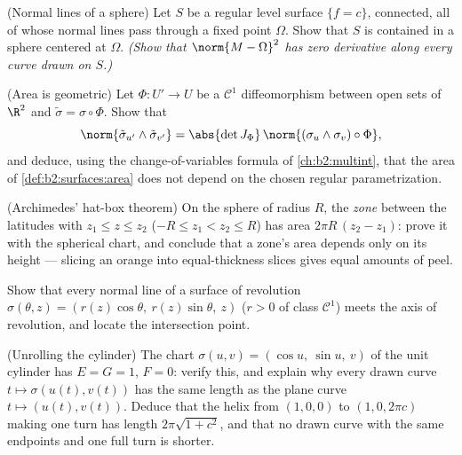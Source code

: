 \begin{exercise}[$\star\star\star$]\label{exo:b2:surfaces:7}
(Normal lines of a sphere) Let $S$ be a regular level surface
$\{f = c\}$, connected, all of whose normal lines pass through a
fixed point $\Omega$. Show that $S$ is contained in a sphere
centered at $\Omega$. \emph{(Show that $\norm{M - \Omega}^2$ has
zero derivative along every curve drawn on $S$.)}
\end{exercise}

\begin{exercise}[$\star\star\star$]\label{exo:b2:surfaces:8}
(Area is geometric) Let $\Phi \colon U' \to U$ be a $\mathcal{C}^1$
diffeomorphism between open sets of $\R^2$ and $\tilde\sigma =
\sigma \circ \Phi$. Show that
\[
\norm{\tilde\sigma_{u'} \wedge \tilde\sigma_{v'}}
= \abs{\det J_\Phi}\,
\norm{(\sigma_u \wedge \sigma_v)\circ\Phi} ,
\]
and deduce, using the change-of-variables formula of
\cref{ch:b2:multint}, that the area of
\cref{def:b2:surfaces:area} does not depend on the chosen regular
parametrization.
\end{exercise}

\begin{exercise}[$\star$]\label{exo:b2:surfaces:9}
(Archimedes' hat-box theorem) On the sphere of radius $R$, the
\emph{zone} between the latitudes with $z_1 \leq z \leq z_2$
($-R \leq z_1 < z_2 \leq R$) has area $2\pi R\,(z_2 - z_1)$:
prove it with the spherical chart, and conclude that a zone's
area depends only on its height --- slicing an orange into
equal-thickness slices gives equal amounts of peel.
\end{exercise}

\begin{exercise}[$\star\star$]\label{exo:b2:surfaces:10}
Show that every normal line of a surface of revolution
$\sigma(\theta, z) = (r(z)\cos\theta,\ r(z)\sin\theta,\ z)$
($r > 0$ of class $\mathcal C^1$) meets the axis of
revolution, and locate the intersection point.
\end{exercise}

\begin{exercise}[$\star\star$]\label{exo:b2:surfaces:11}
(Unrolling the cylinder) The chart $\sigma(u, v) = (\cos u,\
\sin u,\ v)$ of the unit cylinder has $E = G = 1$, $F = 0$:
verify this, and explain why every drawn curve $t \mapsto
\sigma(u(t), v(t))$ has the same length as the plane curve $t
\mapsto (u(t), v(t))$. Deduce that the helix from $(1, 0, 0)$
to $(1, 0, 2\pi c)$ making one turn has length
$2\pi\sqrt{1 + c^2}$, and that no drawn curve with the same
endpoints and one full turn is shorter.
\end{exercise}

